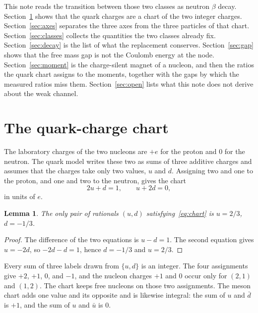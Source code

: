 \documentclass[a4paper]{article}
\newtheorem{lemma}{Lemma}
\begin{document}
This note reads the transition between those two classes as neutron \(\beta\) decay. Section~\ref{sec:chart} shows that the quark charges are a chart of the two integer charges. Section~\ref{sec:axes} separates the three axes from the three particles of that chart. Section~\ref{sec:classes} collects the quantities the two classes already fix. Section~\ref{sec:decay} is the list of what the replacement conserves. Section~\ref{sec:gap} shows that the free mass gap is not the Coulomb energy at the node. Section~\ref{sec:moment} is the charge-silent magnet of a nucleon, and then the ratios the quark chart assigns to the moments, together with the gaps by which the measured ratios miss them. Section~\ref{sec:open} lists what this note does not derive about the weak channel.

\section{The quark-charge chart}
\label{sec:chart}

The laboratory charges of the two nucleons are \(+e\) for the proton and \(0\) for the neutron. The quark model writes these two as sums of three additive charges and assumes that the charges take only two values, \(u\) and \(d\). Assigning two and one to the proton, and one and two to the neutron, gives the chart
\begin{equation}
\label{eq:chart}
2u+d=1,
\qquad
u+2d=0,
\end{equation}
in units of \(e\).

\begin{lemma}
\label{lem:chart}
The only pair of rationals \((u,d)\) satisfying~\eqref{eq:chart} is \(u=2/3\), \(d=-1/3\).
\end{lemma}

\begin{proof}
The difference of the two equations is \(u-d=1\). The second equation gives \(u=-2d\), so \(-2d-d=1\), hence \(d=-1/3\) and \(u=2/3\).
\end{proof}

Every sum of three labels drawn from \(\{u,d\}\) is an integer. The four assignments give \(+2\), \(+1\), \(0\), and \(-1\), and the nucleon charges \(+1\) and \(0\) occur only for \((2,1)\) and \((1,2)\). The chart keeps free nucleons on those two assignments. The meson chart adds one value and its opposite and is likewise integral: the sum of \(u\) and \(\bar d\) is \(+1\), and the sum of \(u\) and \(\bar u\) is \(0\).
\end{document}
